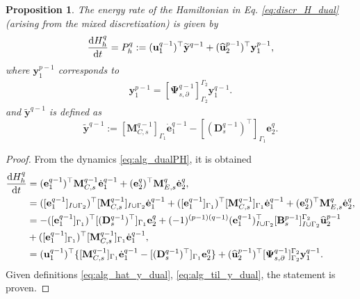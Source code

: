 \documentclass{elsarticle}
\newtheorem{proposition}{Proposition}
\newcommand*{\dual}[1]{\ensuremath{\widehat{#1}}}
\begin{document}
{\begin{proposition}\label{pr:discr_dotH_dual}
The energy rate of the Hamiltonian in Eq. \eqref{eq:discr_H_dual} (arising from the mixed discretization) is given by  
\begin{equation}\label{eq:discr_dotH_dual}
    \diff{{H}_h^{q}}{t} = P_h^q := (\mathbf{u}^{q-1}_1)^\top \widetilde{\mathbf{y}}^{q-1} + (\dual{\mathbf{u}}_2^{p-1})^\top {\mathbf{y}}^{p-1}_1,
\end{equation} 
where ${\mathbf{y}}^{p-1}_1$ corresponds to
\begin{equation}\label{eq:alg_hat_y_dual} 
\begin{aligned}
    \mathbf{y}^{p-1}_1 =  [\mathbf{\Psi}^{q-1}_{s, \partial}]^{\Gamma_2}_{\Gamma_2} \mathbf{y}^{q-1}_1.
\end{aligned}
\end{equation}
 and $\widetilde{\mathbf{y}}^{q-1}$ is defined as
\begin{equation}
    \widetilde{\mathbf{y}}^{q-1} := [\mathbf{M}^{q-1}_{{C}, s}]_{\Gamma_1} \dot{\mathbf{e}}^{q-1}_1 -[(\mathbf{D}_{s}^{q-1})^\top]_{\Gamma_1} {\mathbf{e}}^q_2. \label{eq:alg_til_y_dual} 
\end{equation}
\end{proposition}

\begin{proof}
From the dynamics \eqref{eq:alg_dualPH}, it is obtained
\begin{equation*}
\begin{aligned}
    \diff{H_h^q}{t} &= (\mathbf{e}^{q-1}_1)^\top \mathbf{M}^{q-1}_{{C}, s} \dot{\mathbf{e}}^{q-1}_1 + ({\mathbf{e}}^q_2)^\top \mathbf{M}^q_{E, s} \dot{\mathbf{e}}^q_2, \\  
    &=([{\mathbf{e}}^{q-1}_1]_{I\cup \Gamma_2})^\top [\mathbf{M}^{q-1}_{C, s}]_{I\cup \Gamma_2} \dot{\mathbf{e}}^{q-1}_1 + ([{\mathbf{e}}^{q-1}_1]_{\Gamma_1})^\top [\mathbf{M}^{q-1}_{C, s}]_{\Gamma_1} \dot{\mathbf{e}}^{q-1}_1 + ({\mathbf{e}}^q_2)^\top \mathbf{M}^q_{E, s} \dot{\mathbf{e}}^q_2,\\
    &=- ([{\mathbf{e}}^{q-1}_1]_{\Gamma_1})^\top[(\mathbf{D}_{s}^{q-1})^\top]_{\Gamma_1}{\mathbf{e}}^q_2  + (-1)^{(p-1)(q-1)} ({\mathbf{e}}^{q-1}_1)^\top_{I \cup \Gamma_2}[\mathbf{B}_{s}^{p-1}]_{I \cup \Gamma_2}^{\Gamma_2} \dual{\mathbf{u}}^{p-1}_2 \\
    &+  ([{\mathbf{e}}^{q-1}_1]_{\Gamma_1})^\top [\mathbf{M}^{q-1}_{C, s}]_{\Gamma_1} \dot{\mathbf{e}}^{q-1}_1,\\
    &=(\mathbf{u}^{q-1}_1)^\top \{[\mathbf{M}^{q-1}_{C, s}]_{\Gamma_1} \dot{\mathbf{e}}^{q-1}_1 -[(\mathbf{D}_{s}^{q-1})^\top]_{\Gamma_1} {\mathbf{e}}^q_2\} + (\dual{\mathbf{u}}^{p-1}_2)^\top[\mathbf{\Psi}^{q-1}_{s, \partial}]_{\Gamma_2}^{\Gamma_2} \mathbf{y}^{q-1}_1.
\end{aligned}
\end{equation*}
Given definitions \eqref{eq:alg_hat_y_dual}, \eqref{eq:alg_til_y_dual}, the statement is proven. 
\end{proof}

}
\end{document}
